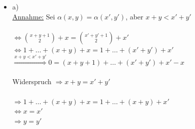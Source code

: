 \documentclass[a4paper]{scrartcl}%
\begin{document}
    \begin{itemize}
        \item a)\\
            \underline{Annahme:} Sei $\alpha(x,y) = \alpha(x',y')$, aber $x+y < x'+y'$\\
            \\$\Leftrightarrow \binom{x+y+1}{2} + x = \binom{x'+y'+1}{2} + x'$\\
            $\Leftrightarrow 1 + \dots + (x+y) + x = 1 + \dots + (x'+y') + x'$\\
            $\overset{x+y < x'+y'}{\Rightarrow} 0 = (x + y + 1) + \dots + (x' + y') + x' - x$\\
            \\Widerspruch $\Rightarrow x + y = x' + y'$\\
            \\$\Rightarrow 1+\dots+(x+y)+x = 1+\dots+(x+y)+x'$\\
            $\Leftrightarrow x = x'$\\
            $\Rightarrow y = y'$\\
        

\end{itemize}
\end{document}
